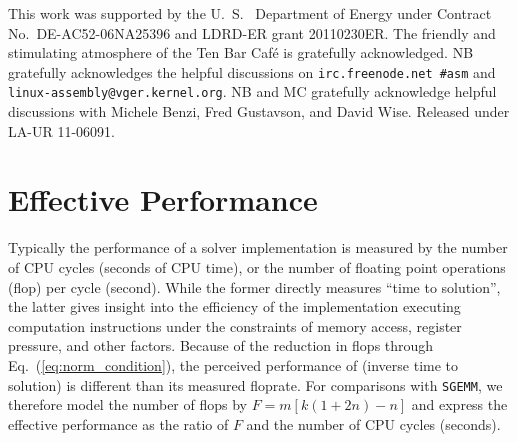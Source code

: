 This work was supported by the U.~S.~ Department of Energy under Contract
No.~DE-AC52-06NA25396 and LDRD-ER grant 20110230ER. The friendly and
stimulating atmosphere of the Ten Bar Caf\'{e} is gratefully acknowledged. NB
gratefully acknowledges the helpful discussions on {\tt irc.freenode.net
\#asm} and {\tt linux-assembly@vger.kernel.org}. NB and MC gratefully
acknowledge helpful discussions with Michele Benzi, Fred Gustavson, and David
Wise. Released under LA-UR 11-06091.

\appendix

\section{Effective Performance}
\label{sec:effective_performance}
Typically the performance of a solver implementation is measured by the number
of CPU cycles (seconds of CPU time), or the number of floating point
operations (flop) per cycle (second). While the former directly measures
``time to solution'', the latter gives insight into the efficiency of the
implementation executing computation instructions under the constraints of
memory access, register pressure, and other factors. Because of the reduction
in flops through Eq.~(\ref{eq:norm_condition}), the perceived performance of
\SpAMM{} (inverse time to solution) is different than its measured floprate.
For comparisons with {\tt SGEMM}, we therefore model the number of flops by $F
=  m \left[ k(1+2n) - n \right]$ and express the effective performance as the
ratio of $F$ and the number of CPU cycles (seconds).
